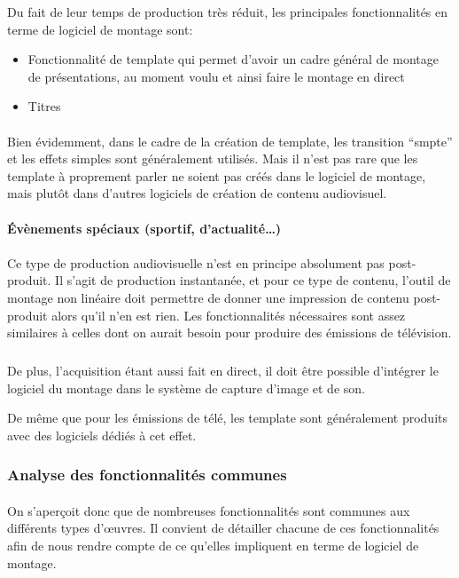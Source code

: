 Du fait de leur temps de production très réduit, les principales fonctionnalités en terme de logiciel
de montage sont:
\begin{itemize}
  \item{Fonctionnalité de template qui permet d'avoir un cadre général de montage de
    présentations, au moment voulu et ainsi faire le montage en direct}
  \item{Titres}
\end{itemize}

\paragraph{}
Bien évidemment, dans le cadre de la création de template, les transition ``smpte'' et les effets simples
sont généralement utilisés. Mais il n'est pas rare que les template à proprement parler ne soient pas créés
dans le logiciel de montage, mais plutôt dans d'autres logiciels de création de contenu audiovisuel.

\paragraph {Évènements spéciaux (sportif, d'actualité\ldots)}

\paragraph{}
Ce type de production audiovisuelle n'est en principe absolument pas post-produit. Il
s'agit de production instantanée, et pour ce type de contenu, l'outil de montage non
linéaire doit permettre de donner une impression de contenu post-produit alors
qu'il n'en est rien. Les fonctionnalités nécessaires sont assez similaires
à celles dont on aurait besoin pour produire des émissions de télévision.

\subparagraph{}
De plus, l'acquisition étant aussi fait en direct, il doit être possible
d'intégrer le logiciel du montage dans le système de capture d'image et de son.

De même que pour les émissions de télé, les template sont généralement produits avec des logiciels
dédiés à cet effet.

\subsubsection{Analyse des fonctionnalités communes}

\paragraph{}
On s'aperçoit donc que de nombreuses fonctionnalités sont communes aux différents
types d'œuvres. Il convient de détailler chacune de ces fonctionnalités afin de
nous rendre compte de ce qu'elles impliquent en terme de logiciel de montage.

